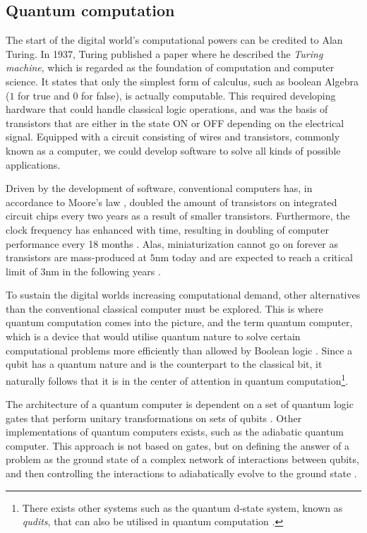 \subsection{Quantum computation}
The start of the digital world's computational powers can be credited to Alan Turing. In 1937, Turing \cite{Turing1937} published a paper where he described the \textit{Turing machine}, which is regarded as the foundation of computation and computer science. It states that only the simplest form of calculus, such as boolean Algebra ($1$ for true and $0$ for false), is actually computable. This required developing hardware that could handle classical logic operations, and was the basis of transistors that are either in the state ON or OFF depending on the electrical signal. Equipped with a circuit consisting of wires and transistors, commonly known as a computer, we could develop software to solve all kinds of possible applications.

Driven by the development of software, conventional computers has, in accordance to Moore's law \cite{Moore1965}, doubled the amount of transistors on integrated circuit chips every two years as a result of smaller transistors. Furthermore, the clock frequency has enhanced with time, resulting in doubling of computer performance every 18 months \cite{Pavicic2006}. Alas, miniaturization cannot go on forever as transistors are mass-produced at $5$nm today and are expected to reach a critical limit of $3$nm in the following years \cite{Gwennap2020}.

To sustain the digital worlds increasing computational demand, other alternatives than the conventional classical computer must be explored. This is where quantum computation comes into the picture, and the term quantum computer, which is a device that would utilise quantum nature to solve certain computational problems more efficiently than allowed by Boolean logic \cite{Weber2010}. Since a qubit has a quantum nature and is the counterpart to the classical bit, it naturally follows that it is in the center of attention in quantum computation\footnote{There exists other systems such as the quantum d-state system, known as \textit{qudits}, that can also be utilised in quantum computation \cite{Ladd2010}.}.

The architecture of a quantum computer is dependent on a set of quantum logic gates that perform unitary transformations on sets of qubits \cite{DiVincenzo2000, Ladd2010}. Other implementations of quantum computers exists, such as the adiabatic quantum computer. This approach is not based on gates, but on defining the answer of a problem as the ground state of a complex network of interactions between qubits, and then controlling the interactions to adiabatically evolve to the ground state \cite{Mizel2007}.

